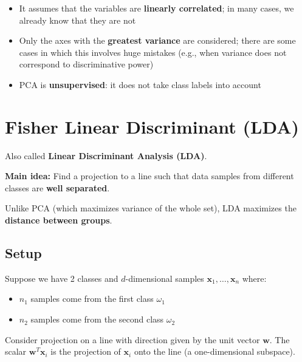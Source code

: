 \documentclass[11pt,a4paper]{article}
\theoremstyle{definition}
\theoremstyle{plain}
\theoremstyle{remark}
\begin{document}
\begin{tcolorbox}[colback=red!5!white,colframe=red!75!black,title=\textbf{PCA Drawbacks}]
\begin{itemize}
    \item It assumes that the variables are \textbf{linearly correlated}; in many cases, we already know that they are not
    \item Only the axes with the \textbf{greatest variance} are considered; there are some cases in which this involves huge mistakes (e.g., when variance does not correspond to discriminative power)
    \item PCA is \textbf{unsupervised}: it does not take class labels into account
\end{itemize}
\end{tcolorbox}


\section{Fisher Linear Discriminant (LDA)}

Also called \textbf{Linear Discriminant Analysis (LDA)}.

\begin{tcolorbox}[colback=green!5!white,colframe=green!75!black,title=\textbf{FDA --- Core Idea}]
\textbf{Main idea:} Find a projection to a line such that data samples from different classes are \textbf{well separated}.

Unlike PCA (which maximizes variance of the whole set), LDA maximizes the \textbf{distance between groups}.
\end{tcolorbox}

\subsection{Setup}

Suppose we have 2 classes and $d$-dimensional samples $\mathbf{x}_1, \ldots, \mathbf{x}_n$ where:
\begin{itemize}
    \item $n_1$ samples come from the first class $\omega_1$
    \item $n_2$ samples come from the second class $\omega_2$
\end{itemize}

Consider projection on a line with direction given by the unit vector $\mathbf{w}$. The scalar $\mathbf{w}^T \mathbf{x}_i$ is the projection of $\mathbf{x}_i$ onto the line (a one-dimensional subspace).
\end{document}
